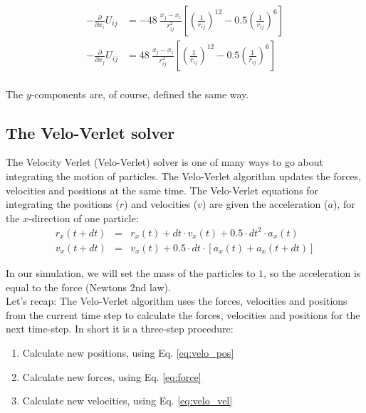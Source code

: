 \documentclass{article}
\begin{document}
\begin{align}
    -\frac{\partial}{\partial x_i} U_{ij} &= -48\ \frac{x_j - x_i}{r^2_{ij}}\left[ \left(\frac{1}{r_{ij}} \right)^{12} - 0.5 \left(\frac{1}{r_{ij}} \right)^6 \right] \\
    -\frac{\partial}{\partial x_j} U_{ij} &=  48\ \frac{x_j - x_i}{r^2_{ij}}\left[ \left(\frac{1}{r_{ij}} \right)^{12} - 0.5 \left(\frac{1}{r_{ij}} \right)^6 \right]
\end{align}\\

The $y$-components are, of course, defined the same way.

\subsection{The Velo-Verlet solver}

The Velocity Verlet (Velo-Verlet) solver is one of many ways to go about integrating the motion of particles.
The Velo-Verlet algorithm updates the forces, velocities and positions at the same time.
The Velo-Verlet equations for integrating the positions ($r$) and velocities ($v$) are given the acceleration ($a$), for the $x$-direction of one particle:
\begin{eqnarray}
    r_x(t+dt)   &=& r_x(t) + dt \cdot v_x(t) + 0.5 \cdot dt^2 \cdot a_x(t) \label{eq:velo_pos} \\
    v_x(t + dt) &=& v_x(t) + 0.5 \cdot dt \cdot \left [ a_x(t) + a_x(t+dt) \right ] \label{eq:velo_vel}
\end{eqnarray}

In our simulation, we will set the mass of the particles to $1$, so the acceleration is equal to the force (Newtons 2nd law).\\

Let's recap: The Velo-Verlet algorithm uses the forces,
velocities and positions from the current time step to calculate the forces,
velocities and positions for the next time-step.
In short it is a three-step procedure:

\begin{enumerate}
    \item Calculate new positions, using Eq. \ref{eq:velo_pos}
    \item Calculate new forces, using Eq. \ref{eq:force}
    \item Calculate new velocities, using Eq. \ref{eq:velo_vel}
\end{enumerate}
\end{document}

